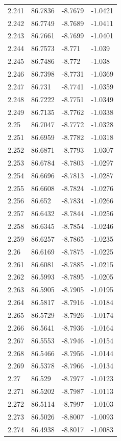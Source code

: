\begin{tabular}{llll}
2.241 & 86.7836 & -8.7679 & -1.0421 \\
2.242 & 86.7749 & -8.7689 & -1.0411 \\
2.243 & 86.7661 & -8.7699 & -1.0401 \\
2.244 & 86.7573 & -8.771 & -1.039 \\
2.245 & 86.7486 & -8.772 & -1.038 \\
2.246 & 86.7398 & -8.7731 & -1.0369 \\
2.247 & 86.731 & -8.7741 & -1.0359 \\
2.248 & 86.7222 & -8.7751 & -1.0349 \\
2.249 & 86.7135 & -8.7762 & -1.0338 \\
2.25 & 86.7047 & -8.7772 & -1.0328 \\
2.251 & 86.6959 & -8.7782 & -1.0318 \\
2.252 & 86.6871 & -8.7793 & -1.0307 \\
2.253 & 86.6784 & -8.7803 & -1.0297 \\
2.254 & 86.6696 & -8.7813 & -1.0287 \\
2.255 & 86.6608 & -8.7824 & -1.0276 \\
2.256 & 86.652 & -8.7834 & -1.0266 \\
2.257 & 86.6432 & -8.7844 & -1.0256 \\
2.258 & 86.6345 & -8.7854 & -1.0246 \\
2.259 & 86.6257 & -8.7865 & -1.0235 \\
2.26 & 86.6169 & -8.7875 & -1.0225 \\
2.261 & 86.6081 & -8.7885 & -1.0215 \\
2.262 & 86.5993 & -8.7895 & -1.0205 \\
2.263 & 86.5905 & -8.7905 & -1.0195 \\
2.264 & 86.5817 & -8.7916 & -1.0184 \\
2.265 & 86.5729 & -8.7926 & -1.0174 \\
2.266 & 86.5641 & -8.7936 & -1.0164 \\
2.267 & 86.5553 & -8.7946 & -1.0154 \\
2.268 & 86.5466 & -8.7956 & -1.0144 \\
2.269 & 86.5378 & -8.7966 & -1.0134 \\
2.27 & 86.529 & -8.7977 & -1.0123 \\
2.271 & 86.5202 & -8.7987 & -1.0113 \\
2.272 & 86.5114 & -8.7997 & -1.0103 \\
2.273 & 86.5026 & -8.8007 & -1.0093 \\
2.274 & 86.4938 & -8.8017 & -1.0083 \\

\end{tabular}

